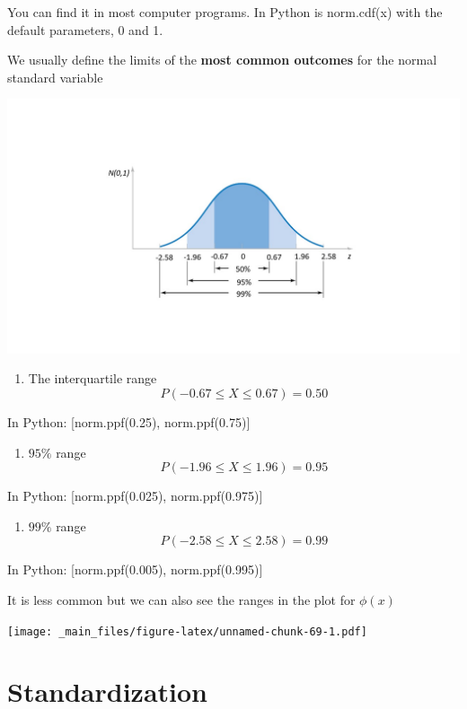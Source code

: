 \documentclass[
]{book}
\providecommand{\tightlist}{%
  \setlength{\itemsep}{0pt}\setlength{\parskip}{0pt}}
\begin{document}
You can find it in most computer programs. In Python is norm.cdf(x) with the default parameters, 0 and 1.

We usually define the limits of the \textbf{most common outcomes} for the normal standard variable

\includegraphics{./figures/phi.JPG}

\begin{enumerate}
\def\labelenumi{\arabic{enumi})}
\tightlist
\item
  The interquartile range \[P(-0.67 \leq X \leq 0.67)=0.50\]
\end{enumerate}

In Python: {[}norm.ppf(0.25), norm.ppf(0.75){]}

\begin{enumerate}
\def\labelenumi{\arabic{enumi})}
\setcounter{enumi}{1}
\tightlist
\item
  \(95\%\) range \[P(-1.96 \leq X \leq 1.96)=0.95\]
\end{enumerate}

In Python: {[}norm.ppf(0.025), norm.ppf(0.975){]}

\begin{enumerate}
\def\labelenumi{\arabic{enumi})}
\setcounter{enumi}{2}
\tightlist
\item
  \(99\%\) range \[P(-2.58 \leq X \leq 2.58)=0.99\]
\end{enumerate}

In Python: {[}norm.ppf(0.005), norm.ppf(0.995){]}

It is less common but we can also see the ranges in the plot for \(\phi(x)\)

\texttt{[image: \_main\_files/figure-latex/unnamed-chunk-69-1.pdf]}

\hypertarget{standardization}{%
\section{Standardization}\label{standardization}}
\end{document}
